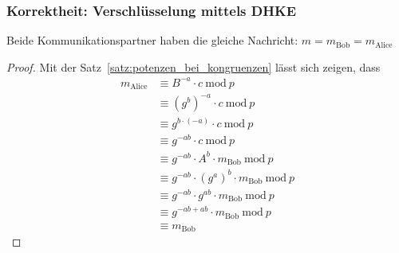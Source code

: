 \documentclass[
  a4paper,
  11pt,
]{scrartcl}
\theoremstyle{plain}
\theoremstyle{definition}
\theoremstyle{remark}
\newcommand{\Mod}[1]{\ \mathrm{mod}\ #1}
\begin{document}
\subsubsection{Korrektheit: Verschlüsselung mittels DHKE}
\label{sub:enc_with_dhke_proof}
Beide Kommunikationspartner haben die gleiche Nachricht: $m = m_{\text{Bob}} = m_{\text{Alice}}$
\begin{proof}
	Mit der Satz~\ref{satz:potenzen_bei_kongruenzen} lässt sich zeigen, dass
	\begin{align*}
      m_{\text{Alice}} & \equiv B^{-a} \cdot c \Mod{p}\\
      & \equiv (g^b)^{-a} \cdot c \Mod{p}\\
      & \equiv g^{b \cdot (-a)} \cdot c \Mod{p}\\
      & \equiv g^{-ab} \cdot c \Mod{p}\\
      & \equiv g^{-ab} \cdot A^b \cdot m_{\text{Bob}} \Mod{p}\\
      & \equiv g^{-ab} \cdot (g^a)^b \cdot m_{\text{Bob}} \Mod{p}\\
      & \equiv g^{-ab} \cdot g^{ab} \cdot m_{\text{Bob}} \Mod{p}\\
      & \equiv g^{-ab+ab} \cdot m_{\text{Bob}} \Mod{p}\\
      & \equiv m_{\text{Bob}}
    \end{align*}
\end{proof}
\end{document}
